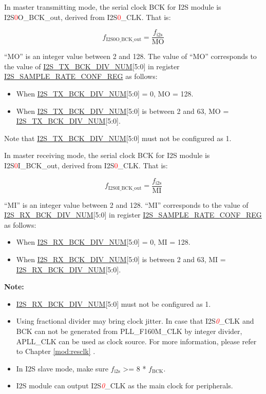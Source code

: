 \documentclass[main\_\_EN.tex]{subfiles}
\begin{document}
In master transmitting mode, the serial clock BCK for I2S module is I2S\textcolor{red}{0}O\_BCK\_out, derived from I2S\textcolor{red}{0}\_CLK. That is:

$$f_{\textrm{I2S0O\_BCK\_out}} = \frac{f_{\textrm{i2s}}}{\textrm{MO}}$$


``MO'' is an integer value between 2 and 128. The value of ``MO'' corresponds to the value of \hyperref[fielddesc:I2STXBCKDIVNUM]{I2S\_TX\_BCK\_DIV\_NUM}[5:0] in register \hyperref[regdesc:I2SSAMPLERATECONFREG]{I2S\_SAMPLE\_RATE\_CONF\_REG} as follows:

\begin{itemize}
    \item When \hyperref[fielddesc:I2STXBCKDIVNUM]{I2S\_TX\_BCK\_DIV\_NUM}[5:0] = 0, MO = 128.

    \item When \hyperref[fielddesc:I2STXBCKDIVNUM]{I2S\_TX\_BCK\_DIV\_NUM}[5:0] is between 2 and 63, MO = \hyperref[fielddesc:I2STXBCKDIVNUM]{I2S\_TX\_BCK\_DIV\_NUM}[5:0].

\end{itemize}

Note that \hyperref[fielddesc:I2STXBCKDIVNUM]{I2S\_TX\_BCK\_DIV\_NUM}[5:0] must not be configured as 1.

In master receiving mode, the serial clock BCK for I2S module is I2S\textcolor{red}{0}I\_BCK\_out, derived from I2S\textcolor{red}{0}\_CLK. That is:

$$f_{\textrm{I2S0I\_BCK\_out}} = \frac{f_{\textrm{i2s}}}{\textrm{MI}}$$

``MI''  is an integer value between 2 and 128. ``MI'' corresponds to the value of \hyperref[fielddesc:I2SRXBCKDIVNUM]{I2S\_RX\_BCK\_DIV\_NUM}[5:0] in register \hyperref[regdesc:I2SSAMPLERATECONFREG]{I2S\_SAMPLE\_RATE\_CONF\_REG} as follows:

\begin{itemize}
    \item When \hyperref[fielddesc:I2SRXBCKDIVNUM]{I2S\_RX\_BCK\_DIV\_NUM}[5:0] = 0, MI = 128.
    \item When \hyperref[fielddesc:I2SRXBCKDIVNUM]{I2S\_RX\_BCK\_DIV\_NUM}[5:0] is between 2 and 63, MI = \hyperref[fielddesc:I2SRXBCKDIVNUM]{I2S\_RX\_BCK\_DIV\_NUM}[5:0].
\end{itemize}

{\bfseries Note: }
\begin{itemize}
    \item \hyperref[fielddesc:I2SRXBCKDIVNUM]{I2S\_RX\_BCK\_DIV\_NUM}[5:0] must not be configured as 1.
    \item Using fractional divider may bring clock jitter. In case that I2S\textcolor{red}{\it{0}}\_CLK  and BCK can not be generated from PLL\_F160M\_CLK by integer divider, APLL\_CLK can be used as clock source. For more information, please refer to Chapter \ref{mod:resclk} \textit{}.
    \item In I2S slave mode, make sure $f_{\textrm{i2s}}$ >= 8 * $f_{\textrm{BCK}}$.
    \item I2S module can output I2S\textcolor{red}{\it{0}}\_CLK as the main clock for peripherals.

\end{itemize}
\end{document}
